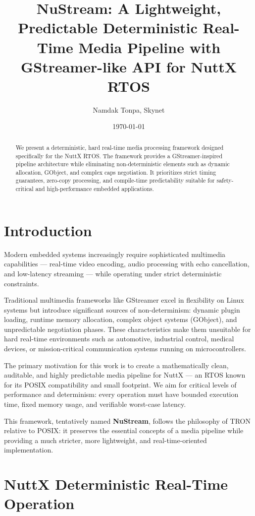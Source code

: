 \documentclass{article}
\title{\textbf{NuStream}: A Lightweight, Predictable Deterministic Real-Time Media Pipeline with GStreamer-like API for NuttX RTOS}
\author{Namdak Tonpa, Skynet}
\date{\today}
\begin{document}
\maketitle

\begin{abstract}
We present a deterministic, hard real-time media processing framework designed specifically for the NuttX RTOS.
The framework provides a GStreamer-inspired pipeline architecture while eliminating non-deterministic elements such as dynamic allocation, GObject, and complex caps negotiation. 
It prioritizes strict timing guarantees, zero-copy processing, and compile-time predictability suitable for safety-critical and high-performance embedded applications.
\end{abstract}

\section{Introduction}

Modern embedded systems increasingly require sophisticated multimedia capabilities — real-time video encoding, audio processing with echo cancellation, and low-latency streaming — while operating under strict deterministic constraints. 

Traditional multimedia frameworks like GStreamer excel in flexibility on Linux systems but introduce significant sources of non-determinism: dynamic plugin loading, runtime memory allocation, complex object systems (GObject), and unpredictable negotiation phases. These characteristics make them unsuitable for hard real-time environments such as automotive, industrial control, medical devices, or mission-critical communication systems running on microcontrollers.

The primary motivation for this work is to create a mathematically clean, auditable, and highly predictable media pipeline for NuttX — an RTOS known for its POSIX compatibility and small footprint. 
We aim for critical levels of performance and determinism: every operation must have bounded execution time, fixed memory usage, and verifiable worst-case latency.

This framework, tentatively named \textbf{NuStream}, follows the philosophy of TRON relative to POSIX: it preserves the essential concepts of a media pipeline while providing a much stricter, more lightweight, and real-time-oriented implementation.

\section{NuttX Deterministic Real-Time Operation}
\end{document}
